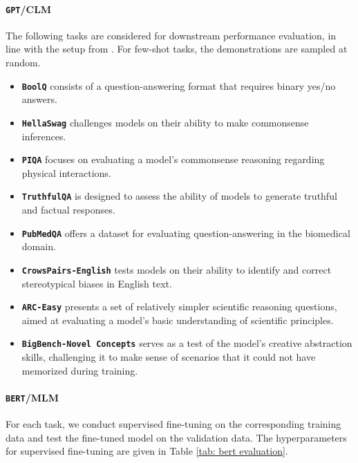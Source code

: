 \documentclass{article} %
\newcommand{\call}[1]{\textbf{\textcolor{orange}{[Call: #1]}}}
\begin{document}
\begin{appendices}{}
\paragraph{\texttt{GPT}/CLM}
The following tasks are considered for downstream performance evaluation, in line with the setup from \citep{mehta2024openelm,gadre2024language}. For few-shot tasks, the demonstrations are sampled at random.
\begin{itemize}
    \item \textbf{\texttt{BoolQ}} \citep{clark2019boolq} consists of a question-answering format that requires binary yes/no answers.
    \item \textbf{\texttt{HellaSwag}} \citep{zellers2019hellaswag} challenges models on their ability to make commonsense inferences.
    \item \textbf{\texttt{PIQA}} \citep{bisk2020piqa} focuses on evaluating a model's commonsense reasoning regarding physical interactions. 
    \item \textbf{\texttt{TruthfulQA}} \citep{lin2021truthfulqa} is designed to assess the ability of models to generate truthful and factual responses.
    \item \textbf{\texttt{PubMedQA}} \citep{jin2019pubmedqa} offers a dataset for evaluating question-answering in the biomedical domain.
    \item \textbf{\texttt{CrowsPairs-English}} \citep{nangia2020crows} tests models on their ability to identify and correct stereotypical biases in English text.
    \item \textbf{\texttt{ARC-Easy}} \citep{clark2018think} presents a set of relatively simpler scientific reasoning questions, aimed at evaluating a model's basic understanding of scientific principles.
    \item \textbf{\texttt{BigBench-Novel Concepts}} \citep{srivastava2022beyond} serves as a test of the model's creative abstraction skills, challenging it to make sense of scenarios that it could not have memorized during training. 



\end{itemize}



\paragraph{\texttt{BERT}/MLM}

For each task, we conduct supervised fine-tuning on the corresponding training data and test the fine-tuned model on the validation data. The hyperparameters for supervised fine-tuning are given in Table \ref{tab: bert evaluation}.



\end{appendices}
\end{document}
